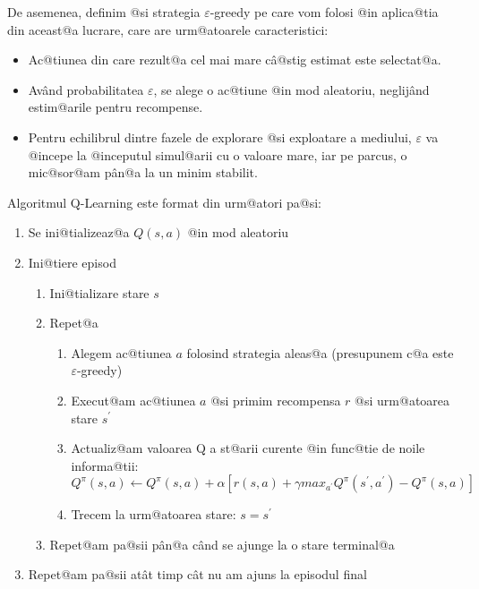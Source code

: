  De asemenea, definim @si strategia $\varepsilon$-greedy pe care vom folosi @in aplica@tia din aceast@a lucrare, care are urm@atoarele caracteristici:

\begin{itemize}
	\item Ac@tiunea din care rezult@a cel mai mare c\^ a@stig estimat este selectat@a.
	\item Av\^ and probabilitatea $\varepsilon$, se alege o ac@tiune @in mod aleatoriu, neglij\^and estim@arile pentru recompense.
	\item Pentru echilibrul dintre fazele de explorare @si exploatare a mediului, $\varepsilon$ va @incepe la @inceputul simul@arii cu o valoare mare, iar pe parcus, o mic@sor@am p\^ an@a la un minim stabilit.
\end{itemize}

Algoritmul Q-Learning este format din urm@atori pa@si:

\renewcommand{\labelenumi}{\bfseries\arabic{enumi}} 
\renewcommand{\labelenumii}{\bfseries\arabic{enumi}.%
                            \arabic{enumii}} 
\renewcommand{\labelenumiii}{\bfseries\arabic{enumi}.%
                             \arabic{enumii}.\arabic{enumiii}} 
\renewcommand{\labelenumiv}{\bfseries\arabic{enumi}.%
                            \arabic{enumii}.\arabic{enumiii}.%
                            \arabic{enumiv}}

\begin{enumerate}
	\item Se ini@tializeaz@a $Q(s, a)$ @in mod aleatoriu
	\item Ini@tiere episod
	\begin{enumerate}
		\item Ini@tializare stare $s$
		\item Repet@a
		\begin{enumerate}
			\item Alegem ac@tiunea $a$ folosind strategia aleas@a (presupunem c@a este $\varepsilon$-greedy)
			\item Execut@am ac@tiunea $a$ @si primim recompensa $r$ @si urm@atoarea stare $s^{\prime}$
			\item Actualiz@am valoarea Q a st@arii curente @in func@tie de noile informa@tii: \begin{equation} \label{eq:q-formula}
			Q^{\pi}(s, a) \leftarrow Q^{\pi}(s, a) + \alpha \left[ r(s,a) + \gamma max_{a^{\prime}} Q^{\pi}(s^{\prime}, a^{\prime}) - Q^{\pi}(s, a) \right]
\end{equation}			
			\item Trecem la urm@atoarea stare: $s = s^{\prime}$
		\end{enumerate}
		\item Repet@am pa@sii p\^ an@a c\^ and se ajunge la o stare terminal@a
	\end{enumerate}	
	\item Repet@am pa@sii at\^at timp c\^ at nu am ajuns la episodul final	
\end{enumerate}

